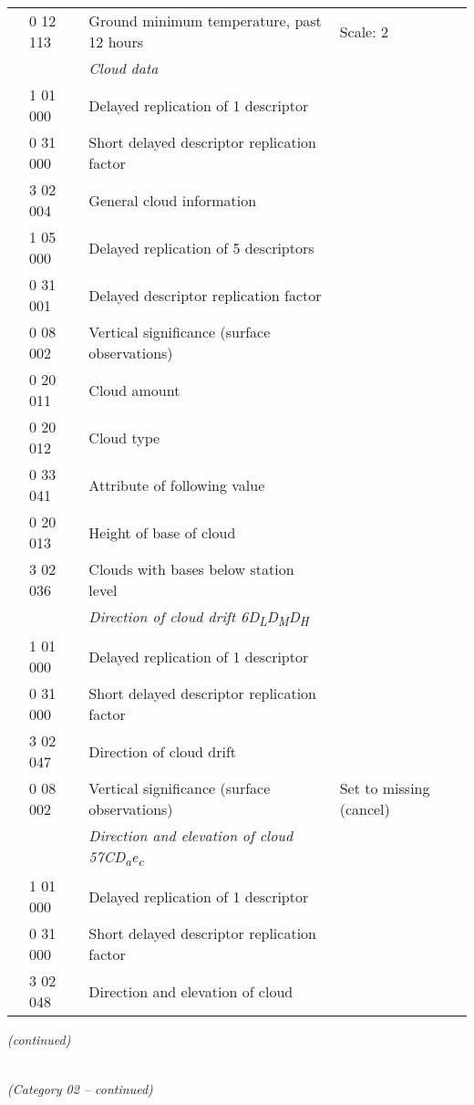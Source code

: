 \begin{longtable}[]{@{}llll@{}}
& 0 12 113 & Ground minimum temperature, past 12 hours & Scale: 2\tabularnewline
& & \emph{Cloud data} &\tabularnewline
& 1 01 000 & Delayed replication of 1 descriptor &\tabularnewline
& 0 31 000 & Short delayed descriptor replication factor &\tabularnewline
& 3 02 004 & General cloud information &\tabularnewline
& 1 05 000 & Delayed replication of 5 descriptors &\tabularnewline
& 0 31 001 & Delayed descriptor replication factor &\tabularnewline
& 0 08 002 & Vertical significance (surface observations) &\tabularnewline
& 0 20 011 & Cloud amount &\tabularnewline
& 0 20 012 & Cloud type &\tabularnewline
& 0 33 041 & Attribute of following value &\tabularnewline
& 0 20 013 & Height of base of cloud &\tabularnewline
& 3 02 036 & Clouds with bases below station level &\tabularnewline
& & \emph{Direction of cloud drift 6D\textsubscript{L}D\textsubscript{M}D\textsubscript{H}} &\tabularnewline
& 1 01 000 & Delayed replication of 1 descriptor &\tabularnewline
& 0 31 000 & Short delayed descriptor replication factor &\tabularnewline
& 3 02 047 & Direction of cloud drift &\tabularnewline
& 0 08 002 & Vertical significance (surface observations) & Set to missing (cancel)\tabularnewline
& & \emph{Direction and elevation of cloud 57CD\textsubscript{a}e\textsubscript{c}} &\tabularnewline
& 1 01 000 & Delayed replication of 1 descriptor &\tabularnewline
& 0 31 000 & Short delayed descriptor replication factor &\tabularnewline
& 3 02 048 & Direction and elevation of cloud &\tabularnewline
\bottomrule
\end{longtable}

\emph{(continued)}

\emph{\\
(Category 02 -- continued)}

